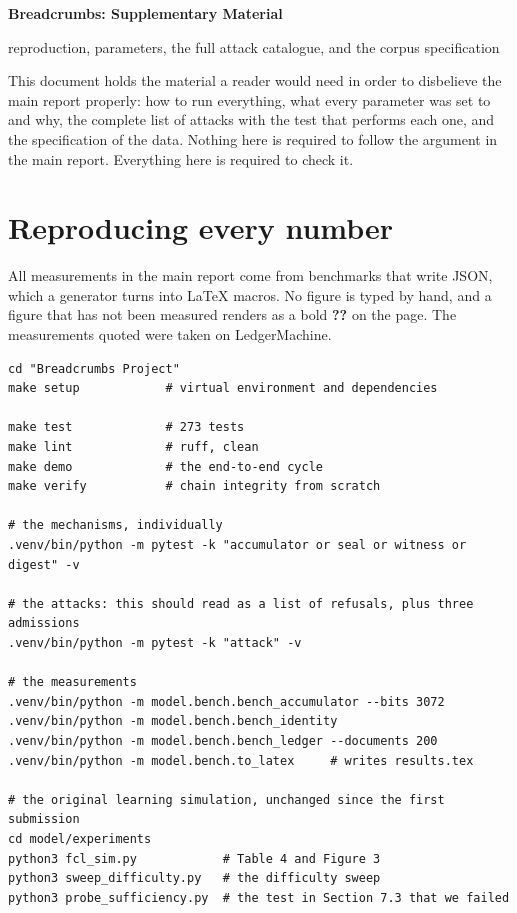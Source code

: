 \renewcommand{\thesection}{S\arabic{section}}
\renewcommand{\thetable}{S\arabic{table}}



\begin{center}
{\sffamily\bfseries\LARGE Breadcrumbs: Supplementary Material\par}
\vspace{0.3cm}
{\sffamily\large\color{tcgrey} reproduction, parameters, the full attack
catalogue, and the corpus specification\par}
\end{center}

\vspace{0.6cm}

This document holds the material a reader would need in order to disbelieve the
main report properly: how to run everything, what every parameter was set to and
why, the complete list of attacks with the test that performs each one, and the
specification of the data. Nothing here is required to follow the argument in the
main report. Everything here is required to check it.

\tableofcontents
\newpage

\section{Reproducing every number}

All measurements in the main report come from benchmarks that write JSON, which a
generator turns into \LaTeX{} macros. No figure is typed by hand, and a figure
that has not been measured renders as a bold \textbf{??} on the page. The
measurements quoted were taken on \num{LedgerMachine}.

\begin{verbatim}
cd "Breadcrumbs Project"
make setup            # virtual environment and dependencies

make test             # 273 tests
make lint             # ruff, clean
make demo             # the end-to-end cycle
make verify           # chain integrity from scratch

# the mechanisms, individually
.venv/bin/python -m pytest -k "accumulator or seal or witness or digest" -v

# the attacks: this should read as a list of refusals, plus three admissions
.venv/bin/python -m pytest -k "attack" -v

# the measurements
.venv/bin/python -m model.bench.bench_accumulator --bits 3072
.venv/bin/python -m model.bench.bench_identity
.venv/bin/python -m model.bench.bench_ledger --documents 200
.venv/bin/python -m model.bench.to_latex     # writes results.tex

# the original learning simulation, unchanged since the first submission
cd model/experiments
python3 fcl_sim.py            # Table 4 and Figure 3
python3 sweep_difficulty.py   # the difficulty sweep
python3 probe_sufficiency.py  # the test in Section 7.3 that we failed
\end{verbatim}

